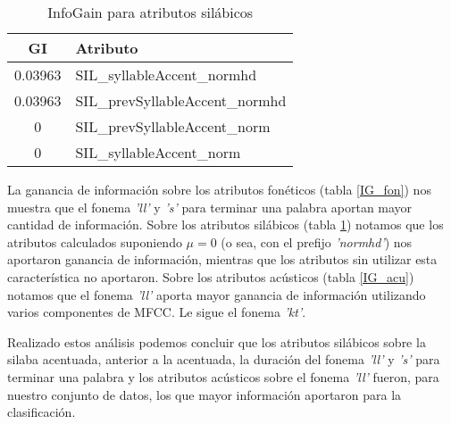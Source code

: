   	\begin{table}[H]
  		\centering
  		\begin{tabular}{cl}
  			\hline
  			\textbf{GI} & \textbf{Atributo} \\ \hline
  			0.03963 & SIL\_syllableAccent\_normhd \\
  			0.03963 & SIL\_prevSyllableAccent\_normhd \\
  			0       & SIL\_prevSyllableAccent\_norm \\
  			0       & SIL\_syllableAccent\_norm \\
  			\hline
  		\end{tabular}
  		\caption{InfoGain para atributos silábicos} 
  		\label{IG_sil}
  	\end{table}
  	
La ganancia de información sobre los atributos fonéticos (tabla \ref{IG_fon}) nos muestra que el fonema \textit{'ll'} y \textit{'s'} para terminar una palabra aportan mayor cantidad de información. Sobre los atributos silábicos (tabla \ref{IG_sil}) notamos que los atributos calculados suponiendo $\mu = 0$ (o sea, con el prefijo \textit{'normhd'}) nos aportaron ganancia de información, mientras que los atributos sin utilizar esta característica no aportaron. Sobre los atributos acústicos (tabla \ref{IG_acu}) notamos que el fonema \textit{'ll'} aporta mayor ganancia de información utilizando varios componentes de MFCC. Le sigue el fonema \textit{'kt'}. 

Realizado estos análisis podemos concluir que los atributos silábicos sobre la silaba acentuada, anterior a la acentuada, la duración del fonema \textit{'ll'} y \textit{'s'} para terminar una palabra y los atributos acústicos sobre el fonema \textit{'ll'} fueron, para nuestro conjunto de datos, los que mayor información aportaron para la clasificación.




